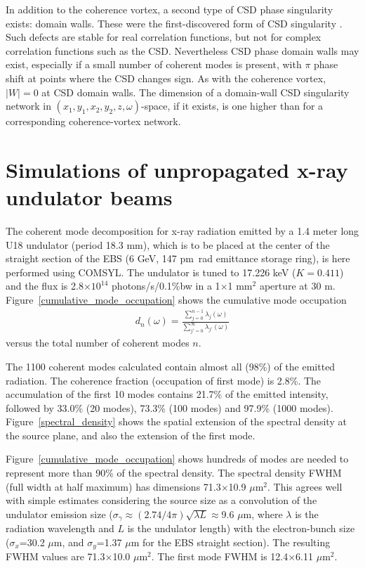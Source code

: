 \documentclass[%
 reprint,
 amsmath,amssymb,
 aps,
]{revtex4-1}
\begin{document}
In addition to the coherence vortex, a second type of CSD phase singularity exists: domain walls.  These were the first-discovered form of CSD  singularity \cite{Schouten2003}.  Such defects are stable for real correlation functions, but not for complex correlation functions such as the CSD.  Nevertheless CSD phase domain walls may exist, especially if a small number of coherent modes is present, with $\pi$ phase shift at points where the CSD changes sign.  As with the coherence vortex, $|W|=0$ at CSD domain walls.  The dimension of a domain-wall CSD singularity network in $(x_1,y_1,x_2,y_2,z,\omega)$-space, if it exists, is one higher than for a corresponding coherence-vortex network.  

\section{Simulations of unpropagated x-ray undulator beams}

The coherent mode decomposition for x-ray radiation emitted by a 1.4 meter long U18 undulator (period 18.3 mm), which is to be placed at the center of the straight section of the EBS (6 GeV, 147 pm~rad emittance storage ring), is here performed using COMSYL. The undulator is tuned to 17.226 keV ($K=0.411$) and the flux is 2.8$\times 10^{14}$ photons/s/0.1\%bw in a 1$\times$1 mm$^2$ aperture at 30 m. Figure~\ref{cumulative_mode_occupation} shows the cumulative mode occupation 
\begin{equation}
\begin{aligned}
\label{spectrum}
d_n(\omega)=\frac{\sum_{j=0}^{n-1} \lambda_j(\omega)}{\sum_{j'=0}^{\infty} \lambda_{j'}(\omega)}
\end{aligned}
\end{equation}
versus the total number of coherent modes $n$.

The 1100 coherent modes calculated contain almost all (98\%) of the emitted radiation. The coherence fraction (occupation of first mode) is 2.8\%. The accumulation of the first 10 modes contains 21.7\% of the emitted intensity, followed by 33.0\% (20 modes), 73.3\% (100 modes) and 97.9\% (1000 modes). 
Figure~\ref{spectral_density} shows the spatial extension of the spectral density at the source plane, and also the extension of the first mode.

Figure~\ref{cumulative_mode_occupation} shows hundreds of modes are needed to represent more than 90\% of the spectral density. The spectral density FWHM (full width at half maximum) has dimensions 71.3$\times$10.9 $\mu$m$^2$. This agrees well with simple estimates considering the source size as a convolution of the undulator emission size ($\sigma_\gamma\approx (2.74/4\pi) \sqrt{\lambda L}\approx$9.6 $\mu$m, where  $\lambda$ is the radiation wavelength and $L$ is the undulator length) with the electron-bunch size ($\sigma_x$=30.2 $\mu$m, and $\sigma_y$=1.37 $\mu$m for the EBS straight section). The resulting FWHM values are 71.3$\times$10.0 $\mu$m$^2$. The first mode FWHM is 12.4$\times$6.11 $\mu$m$^2$.  
\end{document}
